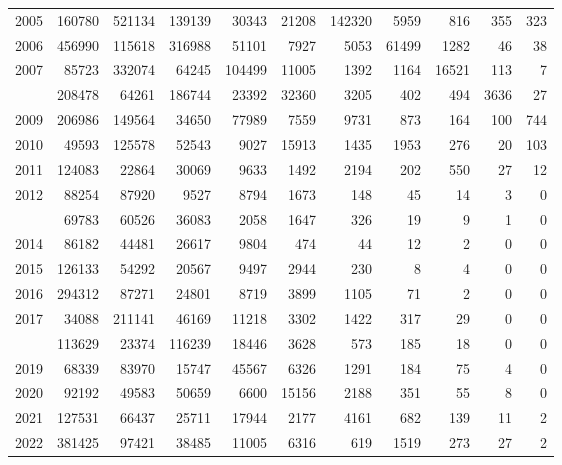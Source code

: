 \documentclass[
]{article}
\begin{document}
\begin{longtable}[t]{lrrrrrrrrrr}
2005 & 160780 & 521134 & 139139 & 30343 & 21208 & 142320 & 5959 & 816 & 355 & 323\\
2006 & 456990 & 115618 & 316988 & 51101 & 7927 & 5053 & 61499 & 1282 & 46 & 38\\
2007 & 85723 & 332074 & 64245 & 104499 & 11005 & 1392 & 1164 & 16521 & 113 & 7\\
\addlinespace
2008 & 208478 & 64261 & 186744 & 23392 & 32360 & 3205 & 402 & 494 & 3636 & 27\\
2009 & 206986 & 149564 & 34650 & 77989 & 7559 & 9731 & 873 & 164 & 100 & 744\\
2010 & 49593 & 125578 & 52543 & 9027 & 15913 & 1435 & 1953 & 276 & 20 & 103\\
2011 & 124083 & 22864 & 30069 & 9633 & 1492 & 2194 & 202 & 550 & 27 & 12\\
2012 & 88254 & 87920 & 9527 & 8794 & 1673 & 148 & 45 & 14 & 3 & 0\\
\addlinespace
2013 & 69783 & 60526 & 36083 & 2058 & 1647 & 326 & 19 & 9 & 1 & 0\\
2014 & 86182 & 44481 & 26617 & 9804 & 474 & 44 & 12 & 2 & 0 & 0\\
2015 & 126133 & 54292 & 20567 & 9497 & 2944 & 230 & 8 & 4 & 0 & 0\\
2016 & 294312 & 87271 & 24801 & 8719 & 3899 & 1105 & 71 & 2 & 0 & 0\\
2017 & 34088 & 211141 & 46169 & 11218 & 3302 & 1422 & 317 & 29 & 0 & 0\\
\addlinespace
2018 & 113629 & 23374 & 116239 & 18446 & 3628 & 573 & 185 & 18 & 0 & 0\\
2019 & 68339 & 83970 & 15747 & 45567 & 6326 & 1291 & 184 & 75 & 4 & 0\\
2020 & 92192 & 49583 & 50659 & 6600 & 15156 & 2188 & 351 & 55 & 8 & 0\\
2021 & 127531 & 66437 & 25711 & 17944 & 2177 & 4161 & 682 & 139 & 11 & 2\\
2022 & 381425 & 97421 & 38485 & 11005 & 6316 & 619 & 1519 & 273 & 27 & 2\\*
\end{longtable}
\end{document}
